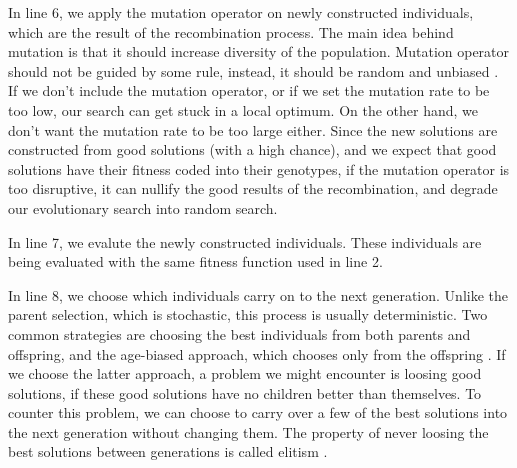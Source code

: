 In line 6, we apply the mutation operator on newly constructed individuals, which are the result of the recombination process. The main idea behind mutation is that it should increase diversity of the population. Mutation operator should not be guided by some rule, instead, it should be random and unbiased \citep{eiben2015evolutionarycomputing}. If we don't include the mutation operator, or if we set the mutation rate to be too low, our search can get stuck in a local optimum. On the other hand, we don't want the mutation rate to be too large either. Since the new solutions are constructed from good solutions (with a high chance), and we expect that good solutions have their fitness coded into their genotypes, if the mutation operator is too disruptive, it can nullify the good results of the recombination, and degrade our evolutionary search into random search. 

In line 7, we evalute the newly constructed individuals. These individuals are being evaluated with the same fitness function used in line 2.

In line 8, we choose which individuals carry on to the next generation. Unlike the parent selection, which is stochastic, this process is usually deterministic. Two common strategies are choosing the best individuals from both parents and offspring, and the age-biased approach, which chooses only from the offspring \citep{eiben2015evolutionarycomputing}. If we choose the latter approach, a problem we might encounter is loosing good solutions, if these good solutions have no children better than themselves. To counter this problem, we can choose to carry over a few of the best solutions into the next generation without changing them. The property of never loosing the best solutions between generations is called elitism \citep{cupic2019evolucijskoracunarstvo}.